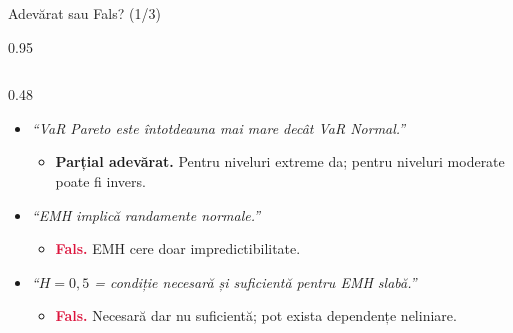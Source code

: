 \documentclass[9pt, aspectratio=169, t]{beamer}
\begin{document}
\begin{frame}[shrink=25]{Adevărat sau Fals? (1/3)}
\begin{cminipage}{0.95\textwidth}
\begin{columns}[T]
\begin{column}{0.48\textwidth}
\begin{itemize}
    \begin{itemize}\setlength{\itemsep}{0pt}
        \item[] \textcolor{Crimson}{\textbf{Fals.}} $\beta = 0$ indică simetrie; normala cere $\alpha = 2$.
    \end{itemize}
    \item \textit{``VaR Pareto este întotdeauna mai mare decât VaR Normal.''}
    \begin{itemize}\setlength{\itemsep}{0pt}
        \item[] \textcolor{Amber}{\textbf{Parțial adevărat.}} Pentru niveluri extreme da; pentru niveluri moderate poate fi invers.
    \end{itemize}
    \item \textit{``EMH implică randamente normale.''}
    \begin{itemize}\setlength{\itemsep}{0pt}
        \item[] \textcolor{Crimson}{\textbf{Fals.}} EMH cere doar impredictibilitate.
    \end{itemize}
    \item \textit{``$H = 0{,}5$ = condiție necesară și suficientă pentru EMH slabă.''}
    \begin{itemize}\setlength{\itemsep}{0pt}
        \item[] \textcolor{Crimson}{\textbf{Fals.}} Necesară dar nu suficientă; pot exista dependențe neliniare.
    \end{itemize}
\end{itemize}
\end{column}
\end{columns}
\end{cminipage}
\end{frame}
\end{document}
